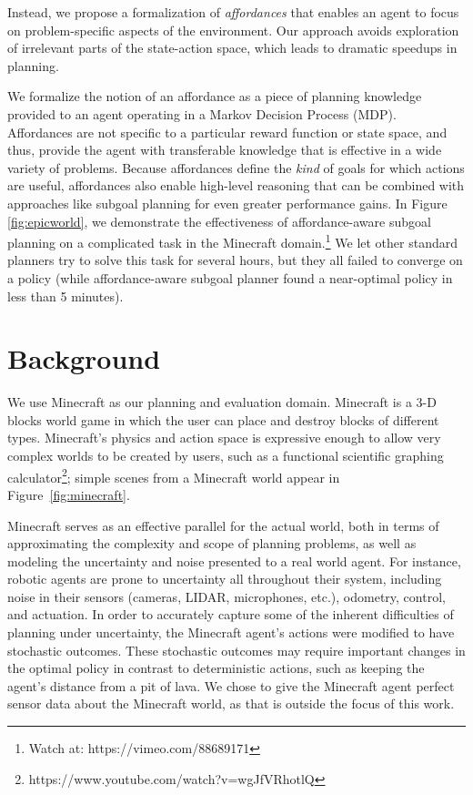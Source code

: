 \documentclass[conference]{IEEEtran}
\begin{document}
Instead, we propose a formalization of {\em affordances} \citep{gibson77} that enables an agent to focus on
problem-specific aspects of the environment. Our approach avoids exploration of irrelevant parts of the 
state-action space, which leads to dramatic speedups in planning.

We formalize the notion of an affordance as a piece of planning
knowledge provided to an agent operating in a Markov Decision
Process (MDP). Affordances are not specific to a particular reward 
function or state space, and thus, provide the agent with transferable 
knowledge that is effective in a wide variety of problems. Because affordances
define the {\em kind} of goals for which actions are useful,
affordances also enable high-level reasoning that can
be combined with approaches like subgoal planning for even
greater performance gains. In Figure \ref{fig:epicworld}, we demonstrate the effectiveness of
affordance-aware subgoal planning on a complicated task
in the Minecraft domain.\footnote{Watch at: https://vimeo.com/88689171}
We let other standard planners try to solve this task for several hours, but they all failed
to converge on a policy (while affordance-aware subgoal planner found a near-optimal
policy in less than 5 minutes).



\section{Background}
\label{sec:background}
We use Minecraft as our planning and evaluation domain. Minecraft is a
3-D blocks world game in which the user can place and destroy blocks
of different types.  Minecraft's physics and action space is expressive
enough to allow very complex worlds to be created by users, such as a
functional scientific graphing calculator\footnote{https://www.youtube.com/watch?v=wgJfVRhotlQ};
simple scenes from a Minecraft world appear in Figure~\ref{fig:minecraft}.  

Minecraft serves as an effective parallel for the actual world, both
in terms of approximating the complexity and scope of planning
problems, as well as modeling the uncertainty and noise presented to a
real world agent.  For instance, robotic agents are prone to
uncertainty all throughout their system, including noise in their
sensors (cameras, LIDAR, microphones, etc.), odometry, control, and
actuation.  In order to accurately capture some of the inherent
difficulties of planning under uncertainty, the Minecraft agent's
actions were modified to have stochastic outcomes. These stochastic
outcomes may require important changes in the optimal policy in
contrast to deterministic actions, such as keeping the agent's
distance from a pit of lava. We chose to give the Minecraft agent perfect
sensor data about the Minecraft world, as that is outside the focus of this
work.
\end{document}
